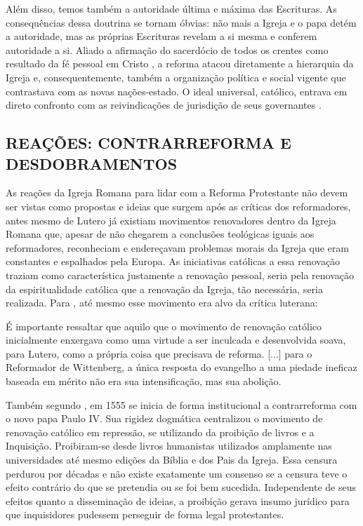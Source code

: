 \documentclass[
    article,            %
	12pt,				%
	oneside,			%
	a4paper,			%
	chapter=TITLE,		%
	section=TITLE,		%
	english,			%
	french,				%
	spanish,			%
	brazil				%
	]{abntex2}
\begin{document}
Além disso, temos também a autoridade última e máxima das Escrituras. As consequências dessa doutrina se tornam óbvias: não mais a Igreja e o papa detém a autoridade, mas as próprias Escrituras revelam a si mesma e conferem autoridade a si. Aliado a afirmação do sacerdócio de todos os crentes como resultado da fé pessoal em Cristo \cite[p.263]{CAIRNS}, a reforma atacou diretamente a hierarquia da Igreja e, consequentemente, também a organização política e social vigente que contrastava com as novas nações-estado. O ideal universal, católico, entrava em direto confronto com as reivindicações de jurisdição de seus governantes \cite[p.252]{CAIRNS}.

\subsection{REAÇÕES: CONTRARREFORMA E DESDOBRAMENTOS}
As reações da Igreja Romana para lidar com a Reforma Protestante não devem ser vistas como propostas e ideias que surgem após as críticas dos reformadores, antes mesmo de Lutero já existiam movimentos renovadores dentro da Igreja Romana que, apesar de não chegarem a conclusões teológicas iguais aos reformadores, reconheciam e endereçavam problemas morais da Igreja que eram constantes e espalhados pela Europa. As iniciativas católicas a essa renovação traziam como característica justamente a renovação pessoal, seria pela renovação da espiritualidade católica que a renovação da Igreja, tão necessária, seria realizada. Para , até mesmo esse movimento era alvo da crítica luterana:

\begin{citacao}
É importante ressaltar que aquilo que o movimento de renovação católico inicialmente enxergava como uma virtude a ser inculcada e desenvolvida soava, para Lutero, como a própria coisa que precisava de reforma. [...] para o Reformador de Wittenberg, a única resposta do evangelho a uma piedade ineficaz baseada em mérito não era sua intensificação, mas sua abolição.
\end{citacao}

Também segundo , em 1555 se inicia de forma institucional a contrarreforma com o novo papa Paulo IV. Sua rigidez dogmática centralizou o movimento de renovação católico em repressão, se utilizando da proibição de livros e a Inquisição. Proibiram-se desde livros humanistas utilizados amplamente nas universidades até mesmo edições da Bíblia e dos Pais da Igreja. Essa censura perdurou por décadas e não existe exatamente um consenso se a censura teve o efeito contrário do que se pretendia ou se foi bem sucedida. Independente de seus efeitos quanto a disseminação de ideias, a proibição gerava insumo jurídico para que inquisidores pudessem perseguir de forma legal protestantes.
\end{document}
